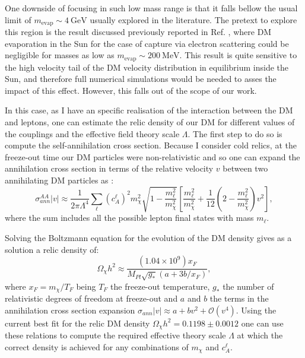 One downside of focusing in such low mass range is that it falls bellow the usual limit of $m_{\mathrm{evap}} \sim 4 \ \mathrm{GeV}$ usually explored in the literature. The pretext to explore this region is the result discussed previously reported in Ref. \cite{Palomares2017}, where DM evaporation in the Sun for the case of capture via electron scattering could be negligible for masses as low as $m_{\mathrm{evap}} \sim 200 \ \mathrm{MeV}$. This result is quite sensitive to the high velocity tail of the DM velocity distribution in equilibrium inside the Sun, and therefore full numerical simulations would be needed to asses the impact of this effect. However, this falls out of the scope of our work.

In this case, as I have an specific realisation of the interaction between the DM and leptons, one can estimate the relic density of our DM for different values of the couplings and the effective field theory scale $\Lambda$. The first step to do so is compute the self-annihilation cross section. Because I consider cold relics, at the freeze-out time our DM particles were non-relativistic and so one can expand the annihilation cross section in terms of the relative velocity $v$ between two annihilating DM particles as \cite{Beltran2008}:
\begin{equation}\label{7.4}
	\sigma_{ann}^{AA}|v| \approx \frac{1}{2\pi\Lambda^{4}} \sum_{\ell} \left(c_{A}^{\ell}\right)^{2} m_{\chi}^{2} \sqrt{1-\frac{m_{\ell}^{2}}{m_{\chi}^{2}}} \left[\frac{m_{\ell}^{2}}{m_{\chi}^{2}}+\frac{1}{12}\left(2-\frac{m_{\ell}^{2}}{m_{\chi}^{2}}\right)v^{2}\right],
\end{equation}
where the sum includes all the possible lepton final states with mass $m_{\ell}$.

Solving the Boltzmann equation for the evolution of the DM density gives as a solution a relic density of:
\begin{equation}\label{7.5}
	\Omega_{\chi} h^{2} \approx \frac{(1.04 \times 10^{9}) x_{F}}{M_{Pl} \sqrt{g_{*}}(a+3b/x_{F})},
\end{equation}
where $x_{F} = m_{\chi}/T_{F}$ being $T_{F}$ the freeze-out temperature, $g_{*}$ the number of relativistic degrees of freedom at freeze-out and $a$ and $b$ the terms in the annihilation cross section expansion $\sigma_{ann} |v| \approx a + b v^{2} + \mathcal{O}(v^{4})$. Using the current best fit for the relic DM density $\Omega_{\chi} h^{2} = 0.1198 \pm 0.0012$ \cite{Planck2018} one can use these relations to compute the required effective theory scale $\Lambda$ at which the correct density is achieved for any combinations of $m_{\chi}$ and $c_{A}^{\ell}$.

